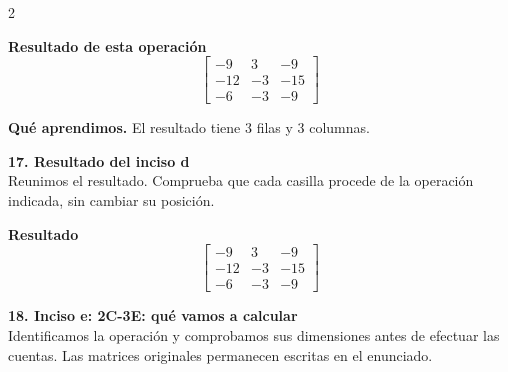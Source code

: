 \documentclass[11pt,a4paper,landscape]{article}
\begin{document}
\begin{multicols*}{2}
\begin{minipage}{\linewidth}
\par{}\par\smallskip
\par\smallskip \textbf{Resultado de esta operación}\[\begin{bmatrix}-9 & 3 & -9\\-12 & -3 & -15\\-6 & -3 & -9\end{bmatrix}\]
\par\smallskip\textbf{Qué aprendimos.} El resultado tiene 3 filas y 3 columnas.
\end{minipage}\par\medskip
\noindent\begin{minipage}{\linewidth}\textbf{17. Resultado del inciso d}\\[2pt]Reunimos el resultado. Comprueba que cada casilla procede de la operación indicada, sin cambiar su posición.
\par\smallskip \textbf{Resultado}\[\begin{bmatrix}-9 & 3 & -9\\-12 & -3 & -15\\-6 & -3 & -9\end{bmatrix}\]
\end{minipage}\par\medskip
\noindent\begin{minipage}{\linewidth}\textbf{18. Inciso e: 2C-3E: qué vamos a calcular}\\[2pt]Identificamos la operación y comprobamos sus dimensiones antes de efectuar las cuentas. Las matrices originales permanecen escritas en el enunciado.

\end{minipage}
\end{multicols*}
\end{document}
